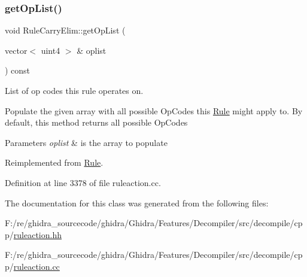 \subsubsection{\texorpdfstring{getOpList()}{getOpList()}}
{\footnotesize\ttfamily void Rule\+Carry\+Elim\+::get\+Op\+List (\begin{DoxyParamCaption}\item[{vector$<$ uint4 $>$ \&}]{oplist }\end{DoxyParamCaption}) const\hspace{0.3cm}{\ttfamily [virtual]}}



List of op codes this rule operates on. 

Populate the given array with all possible Op\+Codes this \mbox{\hyperlink{class_rule}{Rule}} might apply to. By default, this method returns all possible Op\+Codes 
\begin{DoxyParams}{Parameters}
{\em oplist} & is the array to populate \\
\hline
\end{DoxyParams}


Reimplemented from \mbox{\hyperlink{class_rule_a4023bfc7825de0ab866790551856d10e}{Rule}}.



Definition at line 3378 of file ruleaction.\+cc.



The documentation for this class was generated from the following files\+:\begin{DoxyCompactItemize}
\item 
F\+:/re/ghidra\+\_\+sourcecode/ghidra/\+Ghidra/\+Features/\+Decompiler/src/decompile/cpp/\mbox{\hyperlink{ruleaction_8hh}{ruleaction.\+hh}}\item 
F\+:/re/ghidra\+\_\+sourcecode/ghidra/\+Ghidra/\+Features/\+Decompiler/src/decompile/cpp/\mbox{\hyperlink{ruleaction_8cc}{ruleaction.\+cc}}\end{DoxyCompactItemize}
